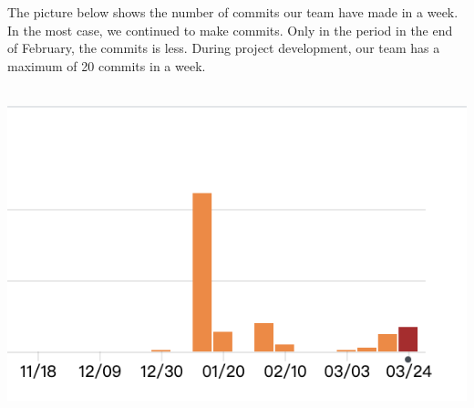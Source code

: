 \documentclass{article}
\begin{document}
The picture below shows the number of commits our team have made in a week. In the most case, we continued to make commits. Only in the period in the end of February, the commits is less. During project development, our team has a maximum of 20 commits in a week.\\\\

\begin{minipage}
\centering
\includegraphics[scale=0.5]{commits.png}
\label{fig:Number of commits}
\end{minipage}
\end{document}
